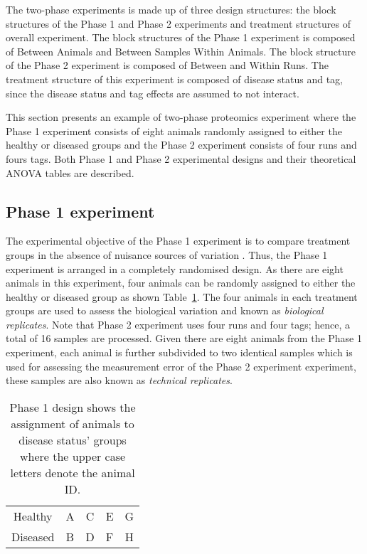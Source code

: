 \documentclass[article]{jss}
\begin{document}
The two-phase experiments is made up of three design structures: the block structures of the Phase 1 and Phase 2 experiments and treatment structures of overall experiment. The block structures of the Phase 1 experiment is composed of Between Animals and Between Samples Within Animals. The block structure of the Phase 2 experiment is composed of Between and Within Runs. The treatment structure of this experiment is composed of disease status and tag, since the disease status and tag effects are assumed to not interact. 

This section presents an example of two-phase proteomics experiment where the Phase 1 experiment consists of eight animals randomly assigned to either the healthy or diseased groups and the Phase 2 experiment consists of four runs and fours tags. Both Phase 1 and Phase 2 experimental designs and their theoretical ANOVA tables are described. 

\subsection{Phase 1 experiment}
\label{subsec:Phase1Exp}
The experimental objective of the Phase 1 experiment is to compare treatment groups in the absence of nuisance sources of variation \citep{Mead1988}. Thus, the Phase 1 experiment is arranged in a completely randomised design. As there are eight animals in this experiment, four animals can be randomly assigned to either the healthy or diseased group as shown Table~\ref{tab:phase1Design}. The four animals in each treatment groups are used to assess the biological variation and known as \emph{biological replicates}. Note that Phase 2 experiment uses four runs and four tags; hence, a total of 16 samples are processed. Given there are eight animals from the Phase 1 experiment, each animal is further subdivided to two identical samples which is used for assessing the measurement error of the Phase 2 experiment experiment, these samples are also known as \emph{technical replicates}.

\begin{table}[ht]
\centering
\caption{Phase 1 design shows the assignment of animals to disease status' groups where the upper case letters denote the animal ID.}
\begin{tabular}[t]{ccccc}
\hline 
Healthy & A & C & E & G \\ 
Diseased & B & D & F & H \\ 
\hline 
\end{tabular} 
\label{tab:phase1Design}
\end{table}
\end{document}

